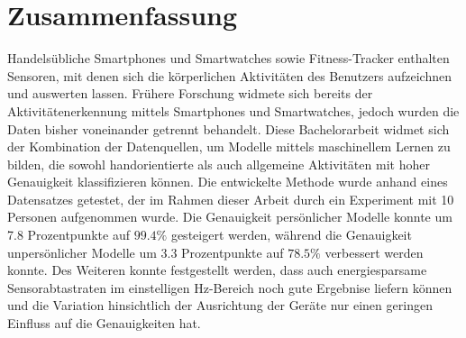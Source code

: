 \chapter*{Zusammenfassung}
Handelsübliche Smartphones und Smartwatches sowie Fitness-Tracker enthalten Sensoren, mit denen sich die körperlichen Aktivitäten des Benutzers aufzeichnen und auswerten lassen. Frühere Forschung widmete sich bereits der Aktivitätenerkennung mittels Smartphones und Smartwatches, jedoch wurden die Daten bisher voneinander getrennt behandelt. Diese Bachelorarbeit widmet sich der Kombination der Datenquellen, um Modelle mittels maschinellem Lernen zu bilden, die sowohl handorientierte als auch allgemeine Aktivitäten mit hoher Genauigkeit klassifizieren können. Die entwickelte Methode wurde anhand eines Datensatzes getestet, der im Rahmen dieser Arbeit durch ein Experiment mit 10 Personen aufgenommen wurde. Die Genauigkeit persönlicher Modelle konnte um 7.8 Prozentpunkte auf $99.4 \%$ gesteigert werden, während die Genauigkeit unpersönlicher Modelle um 3.3 Prozentpunkte auf $78.5 \%$ verbessert werden konnte. Des Weiteren konnte festgestellt werden, dass auch energiesparsame Sensorabtastraten im einstelligen Hz-Bereich noch gute Ergebnise liefern können und die Variation hinsichtlich der Ausrichtung der Geräte nur einen geringen Einfluss auf die Genauigkeiten hat.


